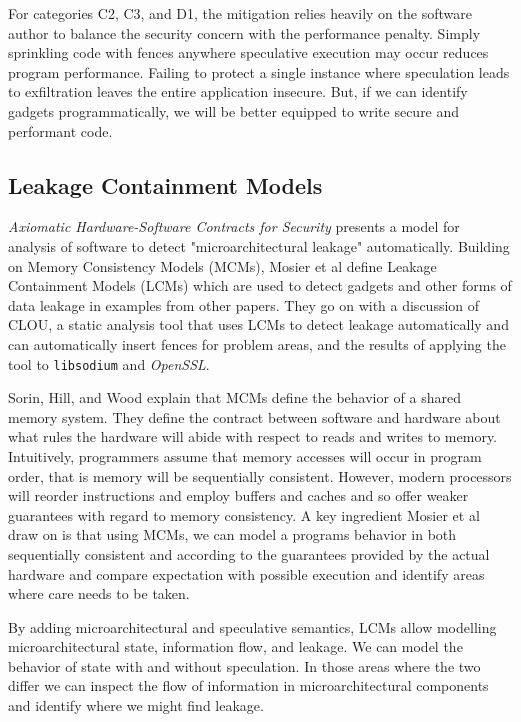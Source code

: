 \documentclass[11pt,conference]{IEEEtran}
\begin{document}
For categories C2, C3, and D1, the mitigation relies heavily on the software author to balance the security concern with the performance penalty.
Simply sprinkling code with fences anywhere speculative execution may occur reduces program performance.
Failing to protect a single instance where speculation leads to exfiltration leaves the entire application insecure.
But, if we can identify gadgets programmatically, we will be better equipped to write secure and performant code.

\subsection{Leakage Containment Models}

\textit{Axiomatic Hardware-Software Contracts for Security}\cite{mosier2022} presents a model for analysis of software to detect "microarchitectural leakage" automatically.
Building on Memory Consistency Models (MCMs), Mosier et al define Leakage Containment Models (LCMs) which are used to detect gadgets and other forms of data leakage in examples from other papers.
They go on with a discussion of CLOU, a static analysis tool that uses LCMs to detect leakage automatically and can automatically insert fences for problem areas, and the results of applying the tool to \texttt{libsodium} and \textit{OpenSSL}.

Sorin, Hill, and Wood explain that MCMs define the behavior of a shared memory system\cite{mcmprimer}.
They define the contract between software and hardware about what rules the hardware will abide with respect to reads and writes to memory.
Intuitively, programmers assume that memory accesses will occur in program order, that is memory will be sequentially consistent.
However, modern processors will reorder instructions and employ buffers and caches and so offer weaker guarantees with regard to memory consistency.
A key ingredient Mosier et al draw on is that using MCMs, we can model a programs behavior in both sequentially consistent and according to the guarantees provided by the actual hardware and compare expectation with possible execution and identify areas where care needs to be taken.

By adding microarchitectural and speculative semantics, LCMs allow modelling microarchitectural state, information flow, and leakage.
We can model the behavior of state with and without speculation.
In those areas where the two differ we can inspect the flow of information in microarchitectural components and identify where we might find leakage.
\end{document}
